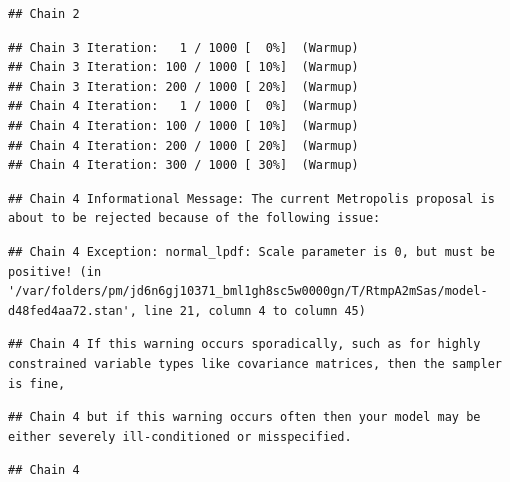 \documentclass[
]{book}
\begin{document}
\begin{verbatim}
## Chain 2
\end{verbatim}

\begin{verbatim}
## Chain 3 Iteration:   1 / 1000 [  0%]  (Warmup) 
## Chain 3 Iteration: 100 / 1000 [ 10%]  (Warmup) 
## Chain 3 Iteration: 200 / 1000 [ 20%]  (Warmup) 
## Chain 4 Iteration:   1 / 1000 [  0%]  (Warmup) 
## Chain 4 Iteration: 100 / 1000 [ 10%]  (Warmup) 
## Chain 4 Iteration: 200 / 1000 [ 20%]  (Warmup) 
## Chain 4 Iteration: 300 / 1000 [ 30%]  (Warmup)
\end{verbatim}

\begin{verbatim}
## Chain 4 Informational Message: The current Metropolis proposal is about to be rejected because of the following issue:
\end{verbatim}

\begin{verbatim}
## Chain 4 Exception: normal_lpdf: Scale parameter is 0, but must be positive! (in '/var/folders/pm/jd6n6gj10371_bml1gh8sc5w0000gn/T/RtmpA2mSas/model-d48fed4aa72.stan', line 21, column 4 to column 45)
\end{verbatim}

\begin{verbatim}
## Chain 4 If this warning occurs sporadically, such as for highly constrained variable types like covariance matrices, then the sampler is fine,
\end{verbatim}

\begin{verbatim}
## Chain 4 but if this warning occurs often then your model may be either severely ill-conditioned or misspecified.
\end{verbatim}

\begin{verbatim}
## Chain 4
\end{verbatim}
\end{document}
